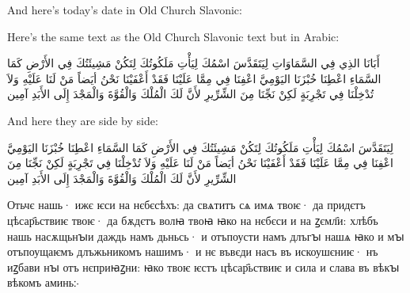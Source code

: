 \documentclass{article}
\begin{document}
And here's today's date in Old Church Slavonic:

\foreignlanguage{churchslavonic}{}

Here's the same text as the Old Church Slavonic text but in Arabic:

\begin{Arabic}
أَبَانَا الذِي فِي السَّمَاوَاتِ
لِيَتَقَدَّسَ اسْمُكَ
لِيَأْتِ مَلَكُوتُكَ
لِتَكُنْ مَشِيئَتُكَ فِي الأَرْضِ كَمَا السَّمَاءِ
اعْطِنَا خُبْزَنَا اليَوْمِيَّ
اعْفِنَا  فِي مِمَّا عَلَيْنَا فَقَدْ أَعْفَيْنَا نَحْنُ أيَضاً مَنْ
لَنَا عَلَيْهِ
وَلاَ تُدْخِلْنَا فِي تَجْرِبَةٍ
لَكِنْ نَجِّنَا مِنَ الشِّرِّيرِ
لأَنَّ لَكَ الْمُلْكَ وَالْقُوَّةَ وَالْمَجْدَ إِلَى الأَبَدِ
آمِين
\end{Arabic}

\pagebreak
And here they are side by side:
\newline
\vspace{0.5mm}
\begin{paracol}{2}
\begin{Arabic}
لِيَتَقَدَّسَ اسْمُكَ
لِيَأْتِ مَلَكُوتُكَ
لِتَكُنْ مَشِيئَتُكَ فِي الأَرْضِ كَمَا السَّمَاءِ
اعْطِنَا خُبْزَنَا اليَوْمِيَّ
اعْفِنَا  فِي مِمَّا عَلَيْنَا فَقَدْ أَعْفَيْنَا نَحْنُ أيَضاً مَنْ
لَنَا عَلَيْهِ
وَلاَ تُدْخِلْنَا فِي تَجْرِبَةٍ
لَكِنْ نَجِّنَا مِنَ الشِّرِّيرِ
لأَنَّ لَكَ الْمُلْكَ وَالْقُوَّةَ وَالْمَجْدَ إِلَى الأَبَدِ
آمِين
\end{Arabic}
\switchcolumn
\foreignlanguage{churchslavonic}
{Отьчє нашь·
ижє ѥси на нєбєсѣхъ:
да свѧтитъ сѧ имѧ твоѥ·
да придєтъ цѣсар҄ьствиѥ твоѥ·
да бѫдєтъ волꙗ твоꙗ
ꙗко на нєбєси и на ꙁємл҄и:
хлѣбъ нашь насѫщьнꙑи
даждь намъ дьньсь·
и отъпоусти намъ длъгꙑ нашѧ
ꙗко и мꙑ отъпоущаѥмъ
длъжьникомъ нашимъ·
и нє въвєди насъ въ искоушєниѥ·
нъ иꙁбави нꙑ отъ нєприꙗꙁни:
ꙗко твоѥ ѥстъ цѣсар҄ьствиѥ
и сила и слава въ вѣкꙑ вѣкомъ
аминь჻}
\end{paracol}
\end{document}
